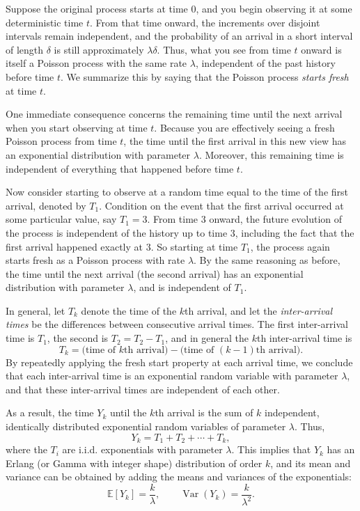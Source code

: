 Suppose the original process starts at time \(0\), and you begin observing it at some deterministic time \(t\).  
From that time onward, the increments over disjoint intervals remain independent, and the probability of an arrival in a short interval of length \(\delta\) is still approximately \(\lambda \delta\).  
Thus, what you see from time \(t\) onward is itself a Poisson process with the same rate \(\lambda\), independent of the past history before time \(t\).  
We summarize this by saying that the Poisson process \textit{starts fresh} at time \(t\).  

One immediate consequence concerns the remaining time until the next arrival when you start observing at time \(t\).  
Because you are effectively seeing a fresh Poisson process from time \(t\), the time until the first arrival in this new view has an exponential distribution with parameter \(\lambda\).  
Moreover, this remaining time is independent of everything that happened before time \(t\).  

Now consider starting to observe at a random time equal to the time of the first arrival, denoted by \(T_1\).  
Condition on the event that the first arrival occurred at some particular value, say \(T_1 = 3\).  
From time \(3\) onward, the future evolution of the process is independent of the history up to time \(3\), including the fact that the first arrival happened exactly at \(3\).  
So starting at time \(T_1\), the process again starts fresh as a Poisson process with rate \(\lambda\).  
By the same reasoning as before, the time until the next arrival (the second arrival) has an exponential distribution with parameter \(\lambda\), and is independent of \(T_1\).  

In general, let \(T_k\) denote the time of the \(k\)th arrival, and let the \textit{inter-arrival times} be the differences between consecutive arrival times.  
The first inter-arrival time is \(T_1\), the second is \(T_2 = T_2 - T_1\), and in general the \(k\)th inter-arrival time is
\[
T_k = \text{(time of \(k\)th arrival)} - \text{(time of \((k-1)\)th arrival)}.
\]
By repeatedly applying the fresh start property at each arrival time, we conclude that each inter-arrival time is an exponential random variable with parameter \(\lambda\), and that these inter-arrival times are independent of each other.  

As a result, the time \(Y_k\) until the \(k\)th arrival is the sum of \(k\) independent, identically distributed exponential random variables of parameter \(\lambda\).  
Thus,
\[
Y_k = T_1 + T_2 + \cdots + T_k,
\]
where the \(T_i\) are i.i.d. exponentials with parameter \(\lambda\).  
This implies that \(Y_k\) has an Erlang (or Gamma with integer shape) distribution of order \(k\), and its mean and variance can be obtained by adding the means and variances of the exponentials:
\[
\mathbb{E}[Y_k] = \frac{k}{\lambda},
\qquad
\operatorname{Var}(Y_k) = \frac{k}{\lambda^2}.
\]

